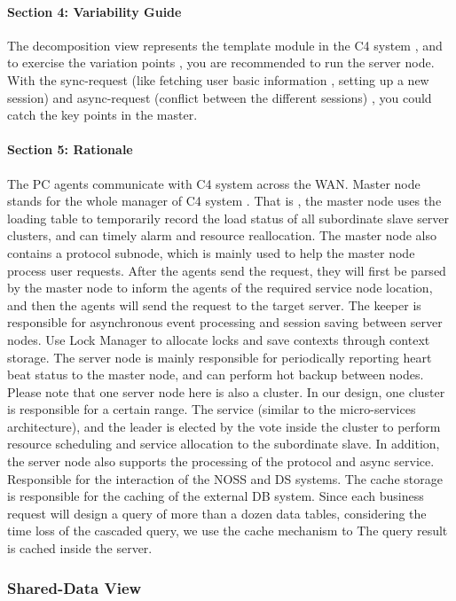 \documentclass{article}
\begin{document}
			\paragraph{Section 4: Variability Guide}
			The decomposition view represents the template module in the C4 system , and to exercise the variation points , you are recommended to run the server node. With the sync-request (like fetching user basic information , setting up a new session)  and async-request (conflict between the different sessions) , you could catch the key points in the master.
			\paragraph{Section 5: Rationale}
			The PC agents communicate with C4 system across the WAN. 
			Master node stands for the whole manager of C4 system . That is ,  the master node uses the loading table to temporarily record the load status of all subordinate slave server clusters, and can timely alarm and resource reallocation. The master node also contains a protocol subnode, which is mainly used to help the master node process user requests. After the agents send the request, they will first be parsed by the master node to inform the agents of the required service node location, and then the agents will send the request to the target server.	
			The keeper is responsible for asynchronous event processing and session saving between server nodes. Use Lock Manager to allocate locks and save contexts through context storage.
			The server node is mainly responsible for periodically reporting heart beat status to the master node, and can perform hot backup between nodes. Please note that one server node here is also a cluster. In our design, one cluster is responsible for a certain range. The service (similar to the micro-services architecture), and the leader is elected by the vote inside the cluster to perform resource scheduling and service allocation to the subordinate slave. In addition, the server node also supports the processing of the protocol and async service. Responsible for the interaction of the NOSS and DS systems. The cache storage is responsible for the caching of the external DB system. Since each business request will design a query of more than a dozen data tables, considering the time loss of the cascaded query, we use the cache mechanism to The query result is cached inside the server.

		\subsubsection{Shared-Data View} 
\end{document}
